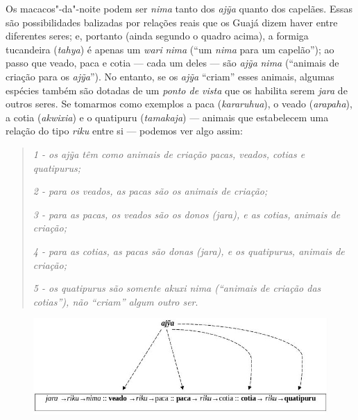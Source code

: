 Os macacos"-da"-noite podem ser \emph{nima} tanto dos \emph{ajỹa} quanto
dos capelães. Essas são possibilidades balizadas por relações reais que
os Guajá dizem haver entre diferentes seres; e, portanto (ainda segundo
o quadro acima), a formiga tucandeira (\emph{tahya}) é apenas um
\emph{wari} \emph{nima} (``um \emph{nima} para um capelão''); ao passo que
veado, paca e cotia --- cada um deles --- são \emph{ajỹa} \emph{nima}
(``animais de criação para os \emph{ajỹa}''). No entanto, se os
\emph{ajỹa} ``criam'' esses animais, algumas espécies também são dotadas
de um \emph{ponto de vista} que os habilita serem \emph{jara} de outros
seres. Se tomarmos como exemplos a paca (\emph{kararuhua}), o veado
(\emph{arapaha}), a cotia (\emph{akwixia}) e o quatipuru
(\emph{tamakaja}) --- animais que estabelecem uma relação do tipo
\emph{riku} entre si --- podemos ver algo assim:

\begin{quote}
\emph{1 - os \emph{ajỹa} têm como animais de criação pacas, veados, cotias e
quatipurus;}

\noindent\emph{2 - para os veados, as pacas são os animais de criação;}

\noindent\emph{3 - para as pacas, os veados são os donos (\emph{jara}), e as cotias,
animais de criação;}

\noindent\emph{4 - para as cotias, as pacas são donas (\emph{jara}), e os quatipurus,
animais de criação;}

\noindent\emph{5 - os quatipurus são somente \emph{akuxi} \emph{nima} (``animais de
criação das cotias''), não ``criam'' algum outro ser}.
\end{quote}

\begin{figure}[H]
\centering
  \includegraphics[width=\textwidth]{./imgs/Figura_13}
\end{figure}


